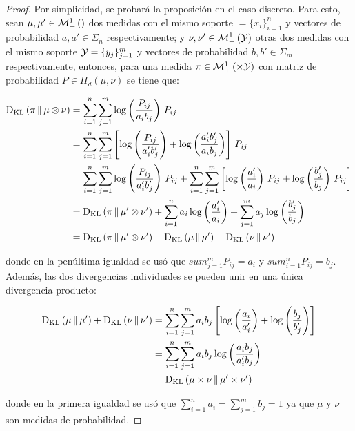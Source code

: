 \begin{proof}
	Por simplicidad, se probará la proposición en el caso discreto. Para esto, sean $\mu,\mu'\in\mathcal{M}_+^1\left(\right)$ dos medidas con el mismo soporte $\xspace=\{x_i\}_{i=1}^n$ y vectores de probabilidad $a,a'\in\Sigma_n$ respectivamente; y $\nu,\nu'\in\mathcal{M}_+^1\left(\mathcal{Y}\right)$ otras dos medidas con el mismo soporte $\mathcal{Y}=\{y_j\}_{j=1}^m$ y vectores de probabilidad $b,b'\in\Sigma_m$ respectivamente, entonces, para una medida $\pi\in\probmeasure{\xspace\times\yspace}$ con matriz de probabilidad $P\in\Pi_d(\mu,\nu)$ se tiene que:

	\begin{align}
		\operatorname{D_{KL}}\left(\pi\,\|\,\mu\otimes\nu\right) & = \sum_{i=1}^n \sum_{j=1}^m \log\left(\frac{P_{ij}}{a_i b_j}\right)\, P_{ij}                                                                                                                                \\
		                        & =\sum_{i=1}^n \sum_{j=1}^m \left[\log\left(\frac{P_{ij}}{a'_i b'_j}\right) + \log\left(\frac{a'_i b'_j}{a_i b_j}\right)\right]\, P_{ij}                                                                         \\
		                        & = \sum_{i=1}^n \sum_{j=1}^m \log\left(\frac{P_{ij}}{a'_i b'_j}\right) \, P_{ij} + \sum_{i=1}^n \sum_{j=1}^m \left[\log\left(\frac{a'_i}{a_i}\right) \, P_{ij} + \log\left(\frac{b'_j}{b_j}\right) \, P_{ij} \right] \\
		                        & = \operatorname{D_{KL}}\left(\pi\,\|\,\mu'\otimes\nu'\right) + \sum_{i=1}^n a_i \log\left(\frac{a'_i}{a_i}\right) + \sum_{j=1}^m a_j \log\left(\frac{b'_j}{b_j}\right)                                                                           \\
		                        & = \operatorname{D_{KL}}\left(\pi\,\|\,\mu'\otimes\nu'\right) - \operatorname{D_{KL}}\left(\mu\,\|\,\mu'\right) - \operatorname{D_{KL}}\left(\nu\,\|\,\nu'\right)
	\end{align}

	donde en la penúltima igualdad se usó que $sum_{j=1}^m P_{ij} = a_i$ y $sum_{i=1}^n P_{ij} = b_j$. Además, las dos divergencias individuales se pueden unir en una única divergencia producto:

	\begin{align}
		\operatorname{D_{KL}}\left(\mu\,\|\,\mu'\right) + \operatorname{D_{KL}}\left(\nu\,\|\,\nu'\right) & = \sum_{i=1}^n \sum_{j=1}^m a_i b_j \left[\log\left(\frac{a_i}{a'_i}\right) + \log\left(\frac{b_j}{b'_j}\right)\right] \\
		                                & = \sum_{i=1}^n \sum_{j=1}^m a_i b_j \log\left(\frac{a_i b_j}{a'_i b_j}\right)                                      \\
		                                & = \operatorname{D_{KL}}\left(\mu\times\nu\,\|\,\mu'\times\nu'\right)
	\end{align}

	donde en la primera igualdad se usó que $\sum_{i=1}^n a_i = \sum_{j=1}^m b_j = 1$ ya que $\mu$ y $\nu$ son medidas de probabilidad.
\end{proof}

